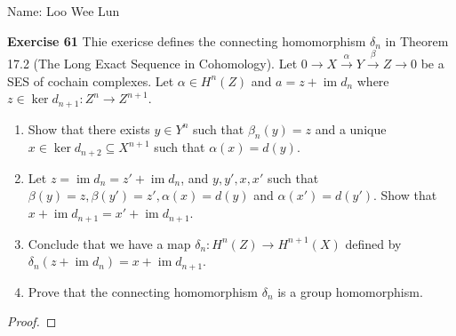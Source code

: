 \documentclass{article}
\theoremstyle{definition}
\newcommand{\im}{\operatorname{im}}
\newcommand{\xto}[1]{\xrightarrow{#1}}
\begin{document}
Name: Loo Wee Lun

\medskip

\textbf{Exercise 61} Thie exericse defines the connecting homomorphism $\delta_n$ in Theorem 17.2 (The Long Exact Sequence in Cohomology). Let $0\to X\xto{\alpha}Y\xto{\beta} Z \to 0 $ be a SES of cochain complexes. Let $\alpha\in H^n(Z)$ and $a=z + \im d_n$ where $z\in \ker d_{n+1} :Z^n \to Z^{n+1}$.
\begin{enumerate}
    \item Show that there exists $y\in Y^n$ such that $\beta_n(y) = z$ and a unique $x\in \ker d_{n+2}\subseteq X^{n+1}$ such that $\alpha(x) = d(y)$.
    \item Let $z = \im d_n = z' + \im d_n$, and $y,y', x, x'$ such that $\beta(y)=z, \beta(y')=z', \alpha(x) = d(y)$ and $\alpha(x')=d(y')$. Show that $x + \im d_{n+1} = x' + \im d_{n+1}$.
    \item Conclude that we have a map $\delta_n:H^n(Z) \to H^{n+1}(X)$ defined by $\delta_n(z+\im d_n) = x + \im d_{n+1}$.
    \item Prove that the connecting homomorphism $\delta_n$ is a group homomorphism.
\end{enumerate}

\begin{proof}
   
\end{proof}
\end{document}
